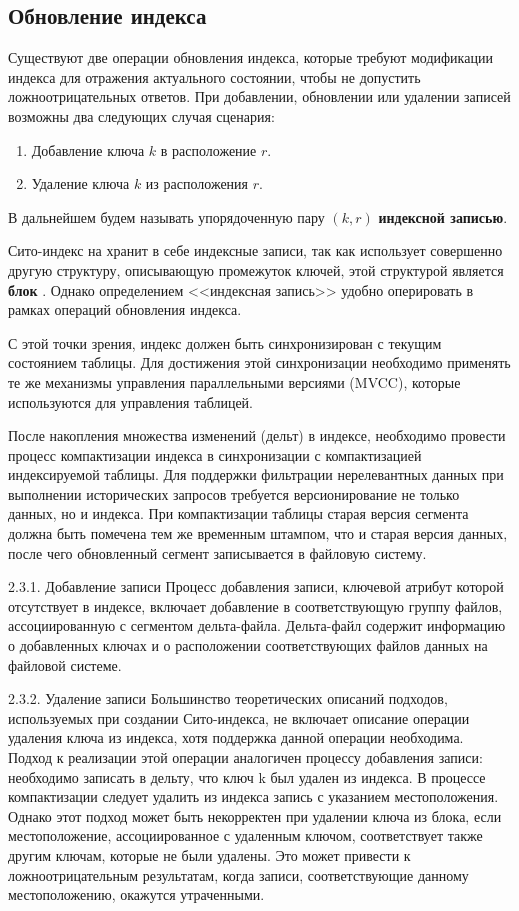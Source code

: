 \subsection{Обновление индекса}

Существуют две операции обновления индекса, которые требуют модификации индекса для отражения актуального состоянии, чтобы не допустить ложноотрицательных ответов. При добавлении, обновлении или удалении записей возможны два следующих случая сценария: 
\begin{enumerate}
    \item Добавление ключа $k$ в расположение $r$.
    \item Удаление ключа $k$ из расположения $r$.
\end{enumerate}

В дальнейшем будем называть упорядоченную пару $(k, r)$ \textbf{индексной записью}.

Сито-индекс на хранит в себе индексные записи, так как использует совершенно другую структуру, описывающую промежуток ключей, этой структурой является \textbf{блок} . Однако определением {<<индексная запись>>} удобно оперировать в рамках операций обновления индекса.



С этой точки зрения, индекс должен быть синхронизирован с текущим состоянием таблицы. Для достижения этой синхронизации необходимо применять те же механизмы управления параллельными версиями (MVCC), которые используются для управления таблицей.

После накопления множества изменений (дельт) в индексе, необходимо провести процесс компактизации индекса в синхронизации с компактизацией индексируемой таблицы. Для поддержки фильтрации нерелевантных данных при выполнении исторических запросов требуется версионирование не только данных, но и индекса. При компактизации таблицы старая версия сегмента должна быть помечена тем же временным штампом, что и старая версия данных, после чего обновленный сегмент записывается в файловую систему.

2.3.1. Добавление записи
Процесс добавления записи, ключевой атрибут которой отсутствует в индексе, включает добавление в соответствующую группу файлов, ассоциированную с сегментом дельта-файла. Дельта-файл содержит информацию о добавленных ключах и о расположении соответствующих файлов данных на файловой системе.

2.3.2. Удаление записи
Большинство теоретических описаний подходов, используемых при создании Сито-индекса, не включает описание операции удаления ключа из индекса, хотя поддержка данной операции необходима. Подход к реализации этой операции аналогичен процессу добавления записи: необходимо записать в дельту, что ключ k был удален из индекса. В процессе компактизации следует удалить из индекса запись с указанием местоположения. Однако этот подход может быть некорректен при удалении ключа из блока, если местоположение, ассоциированное с удаленным ключом, соответствует также другим ключам, которые не были удалены. Это может привести к ложноотрицательным результатам, когда записи, соответствующие данному местоположению, окажутся утраченными.

